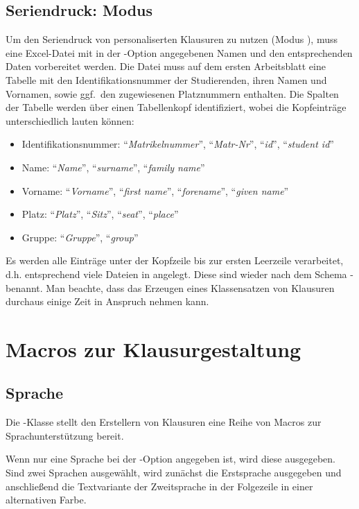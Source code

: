 \documentclass[
load=osgexam,
babel=ngerman
]{skdoc}
\begin{document}
\subsection{Seriendruck: Modus }
\label{sec:series} 
Um den Seriendruck von personaliserten Klausuren zu nutzen (Modus ), muss eine Excel-Datei mit in der
-Option angegebenen Namen und den entsprechenden Daten vorbereitet werden.
 Die Datei muss auf dem ersten Arbeitsblatt eine Tabelle mit den Identifikationsnummer der
Studierenden, ihren Namen und Vornamen, sowie ggf.\ den zugewiesenen Platznummern enthalten. Die Spalten der Tabelle
werden über einen Tabellenkopf identifiziert, wobei die Kopfeinträge unterschiedlich lauten können:
\begin{itemize}[nosep]
  \item Identifikationsnummer: ``\emph{Matrikelnummer}'', ``\emph{Matr-Nr}'', ``\emph{id}'', ``\emph{student id}''
  \item Name: ``\emph{Name}'', ``\emph{surname}'', ``\emph{family name}''
  \item Vorname: ``\emph{Vorname}'', ``\emph{first name}'', ``\emph{forename}'', ``\emph{given name}''
  \item Platz: ``\emph{Platz}'', ``\emph{Sitz}'', ``\emph{seat}'', ``\emph{place}''
  \item Gruppe: ``\emph{Gruppe}'', ``\emph{group}''
\end{itemize}
Es werden alle Einträge unter der Kopfzeile bis zur ersten Leerzeile verarbeitet, d.\;h. entsprechend viele Dateien in
 angelegt. Diese sind wieder nach dem Schema - benannt.
Man beachte, dass das Erzeugen eines Klassensatzen von Klausuren durchaus einige Zeit in Anspruch nehmen kann.

\section{Macros zur Klausurgestaltung}
\subsection{Sprache}
\label{sec:macro:lang}
Die \thepkg-Klasse stellt den Erstellern von Klausuren eine Reihe von Macros zur Sprachunterstützung bereit.

\DescribeMacro{} Wenn nur eine Sprache bei der
-Option angegeben ist, wird diese ausgegeben. Sind zwei Sprachen ausgewählt, wird zunächst die Erstsprache
ausgegeben und anschließend die Textvariante der Zweitsprache in der Folgezeile in einer alternativen Farbe.
\medskip
\end{document}
